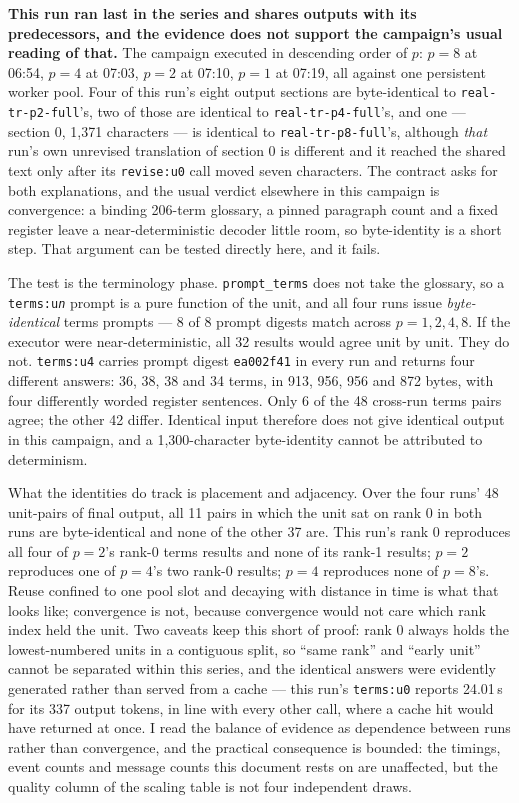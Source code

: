 \documentclass[11pt]{article}
\begin{document}
\textbf{This run ran last in the series and shares outputs with its predecessors, and the
evidence does not support the campaign's usual reading of that.} The campaign executed in
descending order of $p$: $p=8$ at 06:54, $p=4$ at 07:03, $p=2$ at 07:10, $p=1$ at 07:19, all
against one persistent worker pool. Four of this run's eight output sections are byte-identical
to \texttt{real-tr-p2-full}'s, two of those are identical to \texttt{real-tr-p4-full}'s, and one
--- section 0, 1{,}371 characters --- is identical to \texttt{real-tr-p8-full}'s, although
\emph{that} run's own unrevised translation of section 0 is different and it reached the shared
text only after its \texttt{revise:u0} call moved seven characters. The contract asks for both
explanations, and the usual verdict elsewhere in this campaign is convergence: a binding
206-term glossary, a pinned paragraph count and a fixed register leave a near-deterministic
decoder little room, so byte-identity is a short step. That argument can be tested directly here,
and it fails.

The test is the terminology phase. \texttt{prompt\_terms} does not take the glossary, so a
\texttt{terms:u\emph{n}} prompt is a pure function of the unit, and all four runs issue
\emph{byte-identical} terms prompts --- 8 of 8 prompt digests match across $p=1,2,4,8$. If the
executor were near-deterministic, all 32 results would agree unit by unit. They do not.
\texttt{terms:u4} carries prompt digest \texttt{ea002f41} in every run and returns four different
answers: 36, 38, 38 and 34 terms, in 913, 956, 956 and 872 bytes, with four differently worded
register sentences. Only 6 of the 48 cross-run terms pairs agree; the other 42 differ. Identical
input therefore does not give identical output in this campaign, and a 1{,}300-character
byte-identity cannot be attributed to determinism.

What the identities do track is placement and adjacency. Over the four runs' 48 unit-pairs of
final output, all 11 pairs in which the unit sat on rank 0 in both runs are byte-identical and
none of the other 37 are. This run's rank 0 reproduces all four of $p=2$'s rank-0 terms results
and none of its rank-1 results; $p=2$ reproduces one of $p=4$'s two rank-0 results; $p=4$
reproduces none of $p=8$'s. Reuse confined to one pool slot and decaying with distance in time
is what that looks like; convergence is not, because convergence would not care which rank index
held the unit. Two caveats keep this short of proof: rank 0 always holds the lowest-numbered
units in a contiguous split, so ``same rank'' and ``early unit'' cannot be separated within this
series, and the identical answers were evidently generated rather than served from a cache --- this
run's \texttt{terms:u0} reports 24.01\,s for its 337 output tokens, in line with every other
call, where a cache hit would have returned at once. I read
the balance of evidence as dependence between runs rather than convergence, and the practical
consequence is bounded: the timings, event counts and message counts this document rests on are
unaffected, but the quality column of the scaling table is not four independent draws.
\end{document}
